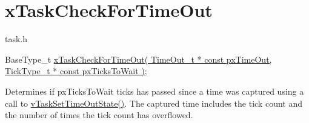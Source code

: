 \hypertarget{group__x_task_check_for_time_out}{}\section{x\+Task\+Check\+For\+Time\+Out}
\label{group__x_task_check_for_time_out}
task.\+h 
\begin{DoxyPre}
BaseType\_t \hyperlink{externals_2freertos_2include_2task_8h_a3b018a85d339e536a6c05748dd666a3a}{xTaskCheckForTimeOut( TimeOut\_t * const pxTimeOut, TickType\_t * const pxTicksToWait )};
\end{DoxyPre}


Determines if px\+Ticks\+To\+Wait ticks has passed since a time was captured using a call to \hyperlink{externals_2freertos_2include_2task_8h_a67155ad4ea2482b5f4597a69f2152be0}{v\+Task\+Set\+Time\+Out\+State()}. The captured time includes the tick count and the number of times the tick count has overflowed.



